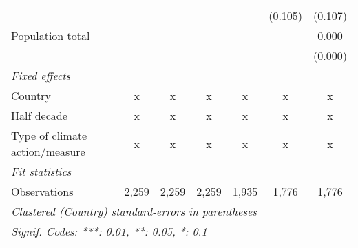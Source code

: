 \begin{tabular}{lcccccc}
                                                  &               &         &         &         & (0.105) & (0.107)\\   
   Population total                               &               &         &         &         &         & 0.000\\   
                                                  &               &         &         &         &         & (0.000)\\   
   \emph{Fixed effects}\\
   Country                                        & x             & x       & x       & x       & x       & x\\  
   Half decade                                    & x             & x       & x       & x       & x       & x\\  
   Type of climate action/measure                 & x             & x       & x       & x       & x       & x\\  
   \midrule \emph{Fit statistics}\\
   Observations                                   & 2,259         & 2,259   & 2,259   & 1,935   & 1,776   & 1,776\\  
   \midrule
   \multicolumn{7}{l}{\emph{Clustered (Country) standard-errors in parentheses}}\\
   \multicolumn{7}{l}{\emph{Signif. Codes: ***: 0.01, **: 0.05, *: 0.1}}\\
\end{tabular}
\par\endgroup


